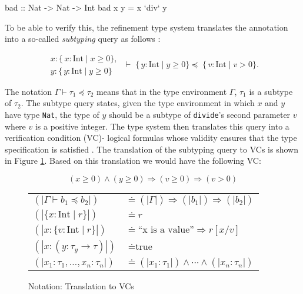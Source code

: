 \documentclass[]{rptuseminar}
\begin{document}
\begin{haskell}  
bad :: Nat -> Nat -> Int 
bad x y = x `div` y
\end{haskell} 
To be able to verify this, the refinement type system translates the annotation into a so-called
\textit{subtyping} query as follows \cite{vazou_refinement_2014}:

\begin{equation*}
\label{eq:subtyping}
\begin{matrix}
x : \{\,x : \mathrm{Int} \mid x \ge 0\}, \\

y : \{\,y : \mathrm{Int} \mid y \ge 0\}
\end{matrix}
\;\vdash\;
\{\,y : \mathrm{Int} \mid y \ge 0\}
\preceq
\;\{\,v : \mathrm{Int} \mid v > 0\}.
\end{equation*}

The notation $\Gamma  \vdash \tau_1 \preceq \tau_2$ means that in the type environment $\Gamma$, 
$\tau_1$ is a subtype of $\tau_2$. The subtype query states, given the type environment in which 
$x$ and $y$ have type \texttt{Nat}, the type of $y$ should be a subtype of \texttt{divide}'s second parameter $v$ where $v$ is a positive integer.
The type system then translates this query into a verification condition (VC)- logical formulas whose validity ensures that the type
specification is satisfied \cite{vazou_refinement_2014}.
The translation of the subtyping query to VCs is shown in Figure \ref{fig:notation}. Based on this
translation we would have the following VC:

\begin{equation}
\label{eq:subtyping-vc}
(x \ge 0) \land (y \ge 0)  \Rightarrow (v \ge 0) \Rightarrow (v > 0)
\end{equation}
\begin{figure}[htbp]
  \centering
  \renewcommand{\arraystretch}{1.4}
  \begin{tabular}{@{}ll@{}}
    \( (|\Gamma \vdash b_1 \preceq b_2|) \) & \( \doteq (|\Gamma|) \Rightarrow (|b_1|) \Rightarrow (|b_2|) \) \\[1ex]
    \( (|\{x:\mathrm{Int} \mid r\}|) \) & \( \doteq r \) \\[1ex]
    \( (|x:\{v:\mathrm{Int} \mid r\}|) \) & \( \doteq \text{``x is a value''} \Rightarrow r[x/v] \) \\[1ex]
    \( (|x:(y:\tau_y \to \tau)|) \) & \( \doteq \text{true} \) \\[1ex]
    \( (|x_1:\tau_1,\ldots,x_n:\tau_n|) \) & \( \doteq (|x_1:\tau_1|) \land \cdots \land (|x_n:\tau_n|) \)
  \end{tabular}
  \caption{Notation: Translation to VCs \cite{vazou_refinement_2014}}
  \label{fig:notation}
\end{figure}
\end{document}
